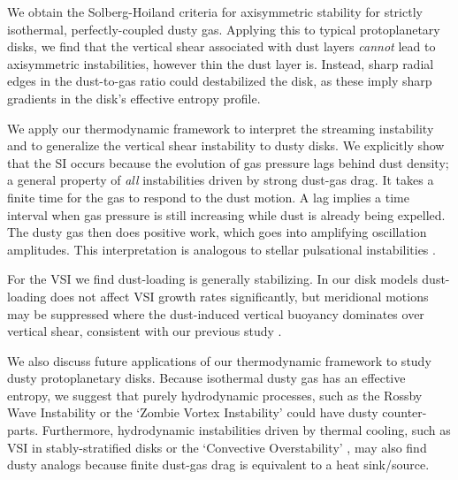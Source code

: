 We obtain the Solberg-Hoiland criteria for axisymmetric stability for
strictly isothermal, perfectly-coupled dusty gas.  
Applying this to typical protoplanetary disks, we find that 
the vertical shear associated with dust 
 layers \emph{cannot} lead to axisymmetric  
  instabilities, however thin the dust layer is.   
Instead, sharp radial  edges in the dust-to-gas ratio could destabilized the
disk, as these imply sharp gradients in the disk's effective entropy
profile. %

We  apply our thermodynamic framework to interpret
the streaming instability \citep[SI, ][]{youdin05a,jacquet11} and to generalize the vertical shear
instability \citep[VSI, ][]{nelson13,lin15} to dusty disks. We
explicitly show that the SI occurs because the evolution of gas
pressure lags behind  dust density; a general property of \emph{all}
instabilities driven by strong dust-gas drag. 
It takes a finite time for the gas to respond to
the dust motion. A lag implies a time interval when
gas pressure is still increasing while dust is already being expelled. 
The dusty gas then does positive work, which goes into amplifying
oscillation amplitudes. This interpretation is analogous to stellar pulsational
instabilities \citep{cox67}. 

For the VSI we find dust-loading is generally stabilizing. In our disk models 
dust-loading does not affect VSI growth rates significantly, but
meridional motions may be suppressed where the dust-induced
vertical buoyancy dominates over vertical shear, consistent with our
previous study \citep{lin15}.  

We also discuss future applications of our thermodynamic framework to 
study dusty protoplanetary disks. Because isothermal dusty gas has an
effective entropy, we suggest that purely hydrodynamic processes, such
as the Rossby Wave Instability \citep{li00} or the `Zombie Vortex
Instability' \citep{marcus15} could have dusty counter-parts.   
Furthermore, hydrodynamic instabilities driven by thermal cooling, such as VSI in
stably-stratified disks \citep{lin15} or the `Convective
Overstability' \citep{klahr14, lyra14},  may also find dusty analogs 
because finite dust-gas drag is equivalent to a heat sink/source. 






 
